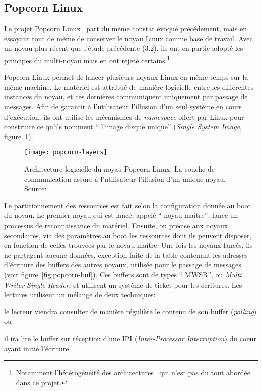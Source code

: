       
    \subsection{Popcorn Linux}

      Le projet Popcorn Linux~\citep{barbalacepopcorn} part du même constat
      évoqué précédement, mais en essayant tout de même de conserver le noyau
      Linux comme base de travail. Avec un noyau plus récent que l'étude
      précédente (3.2), ils ont en partie adopté les principes du multi-noyau
      mais en ont rejeté certains.\footnote{Notamment l'hétérogénéité des
        architectures~\citep{schupbach2008embracing} qui n'est pas du tout
        abordée dans ce projet.}\newline

      Popcorn Linux permet de lancer plusieurs noyaux Linux en même temps sur la
      même machine. Le matériel est attribué de manière logicielle entre les
      différentes instances du noyau, et ces dernières communiquent uniquement
      par passage de messages. Afin de garantir à l’utilisateur l’illusion d’un
      seul système en cours d'exécution, ils ont utilisé les mécanismes de
      \textit{namespace} offert par Linux pour construire ce qu’ils nomment ``
      l’image disque unique'' (\textit{Single System Image},
      figure~\ref{fig:popcorn-layers}). 

      \begin{figure}[h]
        \centering
        \texttt{[image: popcorn-layers]}
        \caption{Architecture logicielle du noyau Popcorn Linux. La couche de
          communication assure à l'utilisateur l'illusion d'un unique noyau.
          Source:~\citeauthor{barbalacepopcorn}}
        \label{fig:popcorn-layers}
      \end{figure}

      Le partitionnement des ressources est fait selon la configuration donnée
      au boot du noyau. Le premier noyau qui est lancé, appelé `` noyau
      maître'', lance un processus de reconnaissance du matériel. Ensuite, on
      précise aux noyaux secondaires, via des paramètres au boot les ressources
      dont ils peuvent disposer, en fonction de celles trouvées par le noyau
      maître. Une fois les noyaux lancés, ils ne partagent aucune données,
      exception faite de la table contenant les adresses d’écriture des buffers
      des autres noyaux, utilisée pour le passage de messages (voir
      figure~\ref{fig:popcorn-buf}). Ces buffers sont de types `` MWSR'', ou
      \textit{Multi Writer Single Reader}, et utilisent un système de ticket
      pour les écritures. Les lectures utilisent un mélange de deux
      techniques:\benumline \item le lecteur viendra consulter de manière
      régulière le contenu de son buffer (\textit{polling}) ou \item il ira lire
      le buffer sur réception d’une IPI (\textit{Inter-Processor Interruption})
      du coeur ayant initié l’écriture\eenumline.

